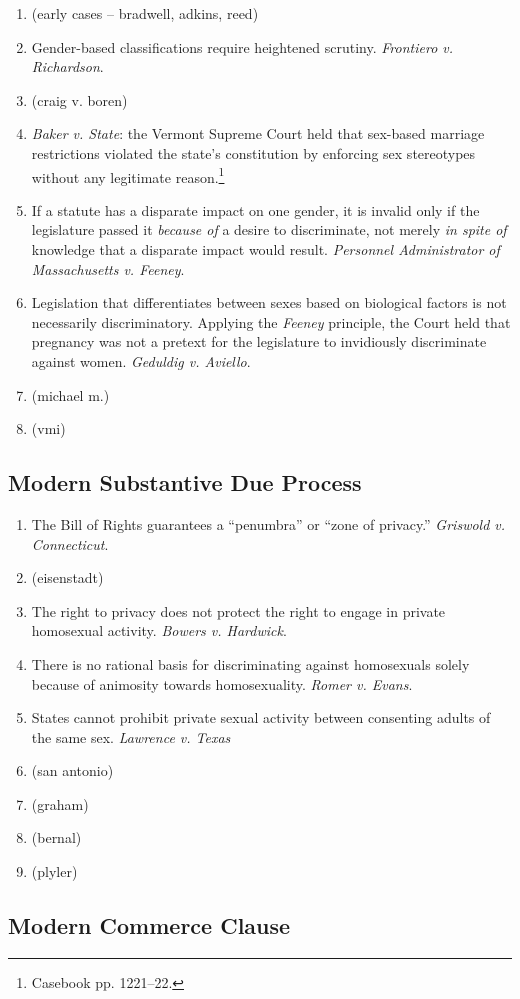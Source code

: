 \begin{enumerate}
    \item (early cases -- bradwell, adkins, reed) %
    \item Gender-based classifications require heightened scrutiny. 
    \emph{Frontiero v. Richardson}.
    \item (craig v. boren) %
    \item \emph{Baker v. State}: the Vermont Supreme Court 
    held that sex-based marriage restrictions violated the state's 
    constitution by enforcing sex stereotypes without any legitimate 
    reason.\footnote{Casebook pp. 1221--22.}
    \item If a statute has a disparate impact on one gender, it is invalid 
    only if the legislature passed it \emph{because of} a desire to 
    discriminate, not merely \emph{in spite of} knowledge that a disparate 
    impact would result. \emph{Personnel Administrator of Massachusetts v. 
    Feeney}.
    \item Legislation that differentiates between sexes based on biological 
    factors is not necessarily discriminatory. Applying the \emph{Feeney} 
    principle, the Court held that pregnancy was not a pretext for the 
    legislature to invidiously discriminate against women. \emph{Geduldig v. 
    Aviello}.
    \item (michael m.) %
    \item (vmi) %
\end{enumerate}

\subsection{Modern Substantive Due Process}

\begin{enumerate}
    \item The Bill of Rights guarantees a ``penumbra'' or ``zone of privacy.'' 
    \emph{Griswold v. Connecticut}.
    \item (eisenstadt) %
    \item The right to privacy does not protect the right to engage in private 
    homosexual activity. \emph{Bowers v. Hardwick}.
    \item There is no rational basis for discriminating against homosexuals 
    solely because of animosity towards homosexuality. \emph{Romer v. Evans}.
    \item States cannot prohibit private sexual activity between consenting 
    adults of the same sex. \emph{Lawrence v. Texas}
    \item (san antonio) %
    \item (graham) %
    \item (bernal) %
    \item (plyler) %
\end{enumerate}

\subsection{Modern Commerce Clause}

